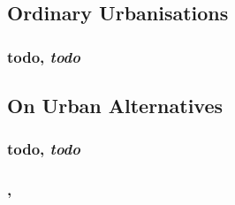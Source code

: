 \documentclass{article}
\begin{document}
\subsection{Ordinary Urbanisations}

\subsubsection{todo, \textit{todo}}

\begin{outline}
	\1
\end{outline}

\subsection{On Urban Alternatives}

\subsubsection{todo, \textit{todo}}

\begin{outline}
	\1
\end{outline}



\subsubsection{, \textit{}}

\begin{outline}
	\1
\end{outline}
\fi
\end{document}
